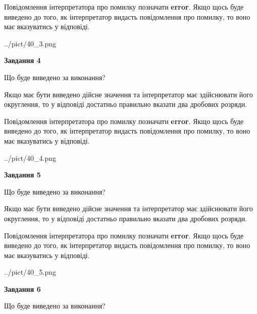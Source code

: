 \documentclass[12pt, ukrainian]{article}
\begin{document}
{\begin {Large}
Повідомлення інтерпретатора про помилку позначати \textbf{error}.
Якщо щось буде виведено до того, як інтерпретатор видасть повідомлення про помилку, 
то воно має вказуватись у відповіді. \par

\begin{center}
	{../pict/40_3.png}
\end{center}
\newpage

{\begin {center}\textbf{Завдання 4}\end {center}}\par
Що буде виведено за виконання? \par

Якщо має бути виведено дійсне значення та інтерпретатор має здійснювати його округлення, 
то у відповіді достатньо правильно вказати два дробових розряди.

Повідомлення інтерпретатора про помилку позначати \textbf{error}.
Якщо щось буде виведено до того, як інтерпретатор видасть повідомлення про помилку, 
то воно має вказуватись у відповіді. \par

\begin{center}
	{../pict/40_4.png}
\end{center}
\newpage

{\begin {center}\textbf{Завдання 5}\end {center}}\par
Що буде виведено за виконання? \par

Якщо має бути виведено дійсне значення та інтерпретатор має здійснювати його округлення, 
то у відповіді достатньо правильно вказати два дробових розряди.

Повідомлення інтерпретатора про помилку позначати \textbf{error}.
Якщо щось буде виведено до того, як інтерпретатор видасть повідомлення про помилку, 
то воно має вказуватись у відповіді. \par

\begin{center}
	{../pict/40_5.png}
\end{center}
\newpage

{\begin {center}\textbf{Завдання 6}\end {center}}\par
Що буде виведено за виконання? \par


\end{Large}}
\end{document}
